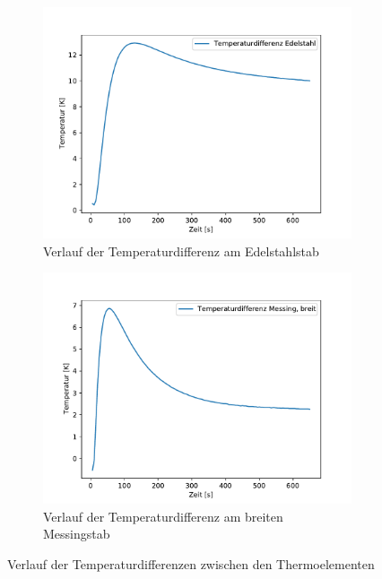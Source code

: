 \begin{figure}[!htbp]
  \begin{subfigure}{\textwidth}
  \centering
  \includegraphics{content/differenz_edel.pdf}
  \caption{Verlauf der Temperaturdifferenz am Edelstahlstab}
  \label{fig:diff_edel}
\end{subfigure}
\begin{subfigure}{\textwidth}
  \centering
  \includegraphics{content/differenz_mess.pdf}
  \caption{Verlauf der Temperaturdifferenz am breiten Messingstab}
  \label{fig:diff_mess}
\end{subfigure}
\caption{Verlauf der Temperaturdifferenzen zwischen den Thermoelementen}
\label{fig:diff}
\end{figure}

